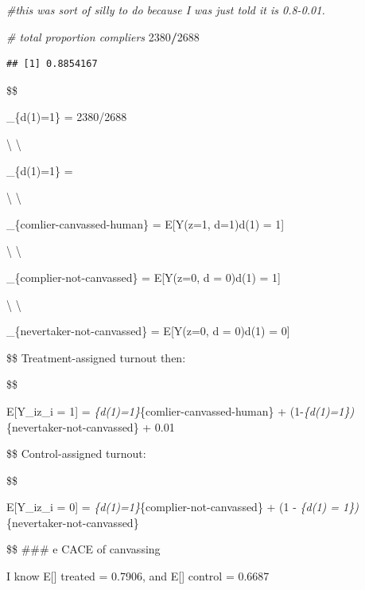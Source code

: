 \documentclass[
]{article}
\newenvironment{Shaded}{\begin{snugshade}}{\end{snugshade}}
\newcommand{\CommentTok}[1]{\textcolor[rgb]{0.56,0.35,0.01}{\textit{#1}}}
\newcommand{\DecValTok}[1]{\textcolor[rgb]{0.00,0.00,0.81}{#1}}
\newcommand{\SpecialCharTok}[1]{\textcolor[rgb]{0.81,0.36,0.00}{\textbf{#1}}}
\begin{document}
\begin{Shaded}
\begin{Highlighting}[]
\CommentTok{\#this was sort of silly to do because I was just told it is 0.8{-}0.01.}

\CommentTok{\# total proportion compliers}
\DecValTok{2380}\SpecialCharTok{/}\DecValTok{2688}
\end{Highlighting}
\end{Shaded}

\begin{verbatim}
## [1] 0.8854167
\end{verbatim}

\$\$

\pi\_\{d(1)=1\} = 2380/2688

\textbackslash{} \textbackslash{}

\pi\_\{d(1)=1\} = 

\textbackslash{} \textbackslash{}

\mu\_\{comlier-canvassed-human\} = E{[}Y(z=1, d=1)\textbar d(1) = 1{]}

\textbackslash{} \textbackslash{}

\mu\_\{complier-not-canvassed\} = E{[}Y(z=0, d = 0)\textbar d(1) = 1{]}

\textbackslash{} \textbackslash{}

\mu\_\{nevertaker-not-canvassed\} = E{[}Y(z=0, d = 0)\textbar d(1) =
0{]}

\$\$ Treatment-assigned turnout then:

\$\$

E{[}Y\_i\textbar z\_i = 1{]} =
\pi\emph{\{d(1)=1\}\mu}\{comlier-canvassed-human\} +
(1-\pi\emph{\{d(1)=1\})\mu}\{nevertaker-not-canvassed\} + 0.01

\$\$ Control-assigned turnout:

\$\$

E{[}Y\_i\textbar z\_i = 0{]} =
\pi\emph{\{d(1)=1\}\mu}\{complier-not-canvassed\} + (1 - \pi\emph{\{d(1)
= 1\})\mu}\{nevertaker-not-canvassed\}

\$\$ \#\#\# e CACE of canvassing

I know E{[}{]} treated = 0.7906, and E{[}{]} control = 0.6687
\end{document}
